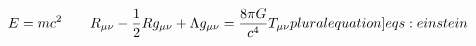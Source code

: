 \documentclass{article}
\begin{document}
\begin{equation}
  E = m c^2 \qquad R_{\mu\nu} - \frac{1}{2} R g_{\mu\nu} + \Lambda g_{\mu\nu} = \frac{8\pi G}{c^4} T_{\mu\nu}
  \label[pluralequation]{eqs:einstein}
  \label{eqs:einstein2}
\end{equation}
\end{document}
